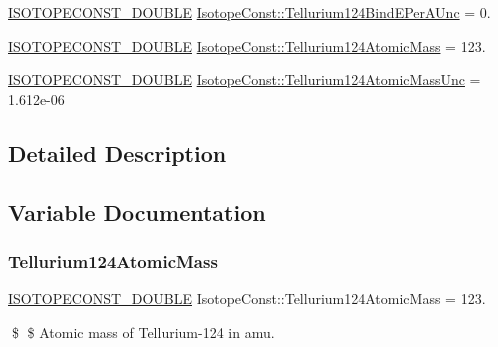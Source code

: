 \begin{DoxyCompactItemize}
\mbox{\hyperlink{group___isotope_const-_macros_ga8f45a7272ce02c0b4c65c44636ed719a}{I\+S\+O\+T\+O\+P\+E\+C\+O\+N\+S\+T\+\_\+\+D\+O\+U\+B\+LE}} \mbox{\hyperlink{group___isotope_const-_tellurium-_te124_ga77d76e1b20fa0b556a98c99234594357}{Isotope\+Const\+::\+Tellurium124\+Bind\+E\+Per\+A\+Unc}} = 0.
\item 
\mbox{\hyperlink{group___isotope_const-_macros_ga8f45a7272ce02c0b4c65c44636ed719a}{I\+S\+O\+T\+O\+P\+E\+C\+O\+N\+S\+T\+\_\+\+D\+O\+U\+B\+LE}} \mbox{\hyperlink{group___isotope_const-_tellurium-_te124_ga42059bd136850d2bc4c6c2dc9509b960}{Isotope\+Const\+::\+Tellurium124\+Atomic\+Mass}} = 123.
\item 
\mbox{\hyperlink{group___isotope_const-_macros_ga8f45a7272ce02c0b4c65c44636ed719a}{I\+S\+O\+T\+O\+P\+E\+C\+O\+N\+S\+T\+\_\+\+D\+O\+U\+B\+LE}} \mbox{\hyperlink{group___isotope_const-_tellurium-_te124_ga2d4c5aa66f01a8ecb1a4c1af3628f3f5}{Isotope\+Const\+::\+Tellurium124\+Atomic\+Mass\+Unc}} = 1.\+612e-\/06
\end{DoxyCompactItemize}


\subsection{Detailed Description}


\subsection{Variable Documentation}
\mbox{\label{group___isotope_const-_tellurium-_te124_ga42059bd136850d2bc4c6c2dc9509b960}} 
\subsubsection{\texorpdfstring{Tellurium124\+Atomic\+Mass}{Tellurium124AtomicMass}}
{\footnotesize\ttfamily \mbox{\hyperlink{group___isotope_const-_macros_ga8f45a7272ce02c0b4c65c44636ed719a}{I\+S\+O\+T\+O\+P\+E\+C\+O\+N\+S\+T\+\_\+\+D\+O\+U\+B\+LE}} Isotope\+Const\+::\+Tellurium124\+Atomic\+Mass = 123.}

\$ \$ Atomic mass of Tellurium-\/124 in amu. \mbox{\label{group___isotope_const-_tellurium-_te124_ga2d4c5aa66f01a8ecb1a4c1af3628f3f5}} 
